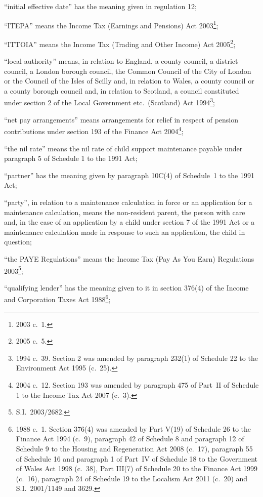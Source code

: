 \documentclass[12pt,a4paper]{article}
\begin{document}
\begin{enumerate}
“initial effective date” has the meaning given in regulation 12;

“ITEPA” means the Income Tax (Earnings and Pensions) Act 2003\footnote{2003 c.~1.};

“ITTOIA” means the Income Tax (Trading and Other Income) Act 2005\footnote{2005 c.~5.};

“local authority” means, in relation to England, a county council, a district council, a London borough council, the Common Council of the City of London or the Council of the Isles of Scilly and, in relation to Wales, a county council or a county borough council and, in relation to Scotland, a council constituted under section 2 of the Local Government etc.\ (Scotland) Act 1994\footnote{1994 c.~39. Section 2 was amended by paragraph 232(1) of Schedule 22 to the Environment Act 1995 (c.~25).};

“net pay arrangements” means arrangements for relief in respect of pension contributions under section 193 of the Finance Act 2004\footnote{2004 c.~12. Section 193 was amended by paragraph 475 of Part~II of Schedule 1 to the Income Tax Act 2007 (c.~3).};

“the nil rate” means the nil rate of child support maintenance payable under paragraph 5 of Schedule 1 to the 1991 Act;

“partner” has the meaning given by paragraph 10C(4) of Schedule~1 to the 1991 Act;

“party”, in relation to a maintenance calculation in force or an application for a maintenance calculation, means the non-resident parent, the person with care and, in the case of an application by a child under section 7 of the 1991 Act or a maintenance calculation made in response to such an application, the child in question;

“the PAYE Regulations” means the Income Tax (Pay As You Earn) Regulations 2003\footnote{S.I.~2003/2682.};

“qualifying lender” has the meaning given to it in section 376(4) of the Income and Corporation Taxes Act 1988\footnote{1988 c.~1. Section 376(4) was amended by Part V(19) of Schedule 26 to the Finance Act 1994 (c.~9), paragraph 42 of Schedule 8 and paragraph 12 of Schedule 9 to the Housing and Regeneration Act 2008 (c.~17), paragraph 55 of Schedule 16 and paragraph 1 of Part~IV of Schedule 18 to the Government of Wales Act 1998 (c.~38), Part III(7) of Schedule 20 to the Finance Act 1999 (c.~16), paragraph 24 of Schedule 19 to the Localism Act 2011 (c.~20) and S.I.~2001/1149 and 3629.};


\end{enumerate}
\end{document}
